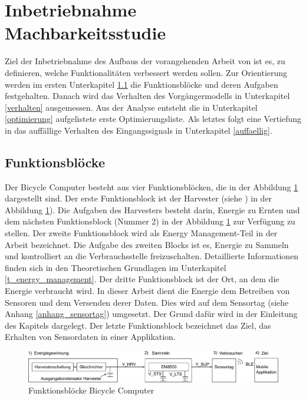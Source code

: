  
\section{Inbetriebnahme Machbarkeitsstudie}\label{v_inbetriebnahme} 

      
Ziel der Inbetriebnahme des Aufbaus der vorangehenden Arbeit von \cite{PA_bicycle} ist es, zu definieren, welche Funktionalitäten verbessert werden sollen. Zur Orientierung werden im ersten Unterkapitel \ref{fb} die Funktionsblöcke und deren Aufgaben festgehalten. Danach wird das Verhalten des Vorgängermodells in Unterkapitel \ref{verhalten} ausgemessen. Aus der Analyse entsteht die in Unterkapitel \ref{optimierung} aufgelistete erste Optimierungsliste. Als letztes folgt eine Vertiefung in das auffällige Verhalten des Eingangssignals in Unterkapitel \ref{auffaellig}.
      
\subsection{Funktionsblöcke}\label{fb} 

Der Bicycle Computer besteht aus vier Funktionsblöcken, die in der Abbildung \ref{funktionsdiagramm_bild} dargestellt sind. Der erste Funktionsblock ist der Harvester (siehe ) \glqq in der Abbildung \ref{funktionsdiagramm_bild}). Die Aufgaben des Harvesters besteht darin, Energie zu Ernten und dem nächsten Funktionsblock (Nummer 2) in der Abbildung  \ref{funktionsdiagramm_bild} zur Verfügung zu stellen. Der zweite Funktionsblock wird als Energy Management-Teil in der Arbeit bezeichnet. Die Aufgabe des zweiten Blocks ist es, Energie zu Sammeln und kontrolliert an die Verbrauchsstelle freizuschalten. Detaillierte Informationen finden sich in den Theoretischen Grundlagen im Unterkapitel \ref{t_energy_management}. Der dritte Funktionsblock ist der Ort, an dem die Energie verbraucht wird. In dieser Arbeit dient die Energie dem Betreiben von Sensoren und dem Versenden derer Daten. Dies wird auf dem Sensortag (siehe Anhang \ref{anhang_sensortag}) umgesetzt. Der Grund dafür wird in der Einleitung des Kapitels \label{t_power_management} dargelegt. Der letzte Funktionsblock bezeichnet das Ziel, das Erhalten von Sensordaten in einer Applikation.  


\begin{figure}[ht]
   \begin{minipage}[t]{1\textwidth}
       \includegraphics[width=1\textwidth]{3Vorgehen/imag/Blockdiagramm.png}
       \caption{Funktionsblöcke Bicycle Computer}
       \label{funktionsdiagramm_bild}
    \end{minipage}
\end{figure}

